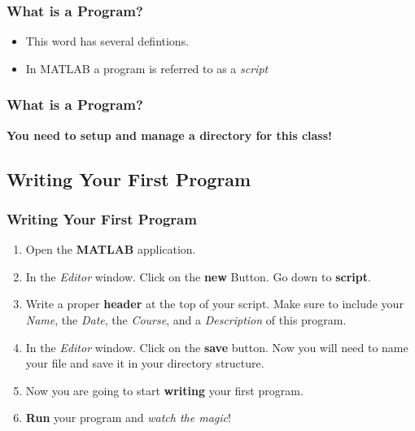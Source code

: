 \documentclass{ltx-talk} %
\newcommand{\sectionIIIsubsectionItitle}{What is a Program?}
\newcommand{\sectionIIIsubsectionIItitle}{Writing Your First Program}
\begin{document}
			\begin{frame}
				\frametitle{\sectionIIIsubsectionItitle}

				\begin{itemize}
					\item This word has several defintions. \\

					\item  In MATLAB a program is referred to as a {\it script}	
				\end{itemize}
					
				\btVFill
			\end{frame}

			\begin{frame}
				\frametitle{\sectionIIIsubsectionItitle}
				\bigskip
				\textbf{ You need to setup and manage a directory for this class!}
				
				\btVFill
			\end{frame}

		\subsection{\sectionIIIsubsectionIItitle}\label{sectionIIIsubsectionII}	

			\begin{frame}
				\frametitle{\sectionIIIsubsectionIItitle}

				\begin{enumerate}
					\item Open the {\bf MATLAB} application.
					\item In the {\it Editor} window. Click on the {\bf new } Button. Go down to {\bf script}.
					\item Write a proper {\bf header} at the top of your script. Make sure to include your {\it Name}, the {\it Date}, the {\it Course}, and a {\it Description} of this program.
					\item In the {\it Editor} window. Click on the {\bf save} button. Now you will need to name your file and save it in your directory structure.
					\item Now you are going to start {\bf writing} your first program. 
					\item {\bf Run} your program and {\it watch the magic}!
				\end{enumerate}
				
				\btVFill
			\end{frame}
\end{document}
